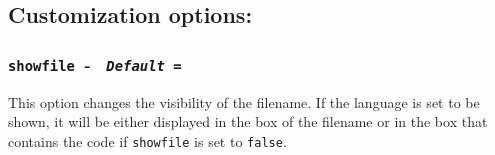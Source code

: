 \documentclass{article}
\begin{document}
\newpage

\subsection*{Customization options:}

\subsubsection*{\texttt{showfile}~-~%
    \hfill \textnormal{\small\textit{\texttt{Default = }}}}

This option changes the visibility of the filename. If the language is set to be shown, it will be either displayed in the box of the filename or in the box that contains the code if \texttt{showfile} is set to \texttt{false}.\\
\end{document}
